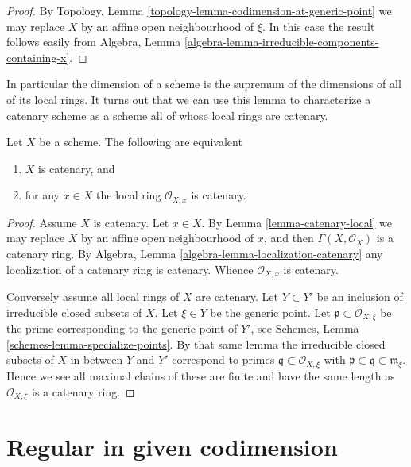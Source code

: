 \begin{proof}
By Topology, Lemma \ref{topology-lemma-codimension-at-generic-point}
we may replace $X$ by an affine open neighbourhood of $\xi$. In this
case the result follows easily from
Algebra, Lemma \ref{algebra-lemma-irreducible-components-containing-x}.
\end{proof}

\noindent
In particular the dimension of a scheme is the supremum of
the dimensions of all of its local rings. It turns out that
we can use this lemma to characterize a catenary scheme as a
scheme all of whose local rings are catenary.

\begin{lemma}
\label{lemma-catenary-local-rings-catenary}
Let $X$ be a scheme. The following are equivalent
\begin{enumerate}
\item $X$ is catenary, and
\item for any $x \in X$ the local ring $\mathcal{O}_{X, x}$ is
catenary.
\end{enumerate}
\end{lemma}

\begin{proof}
Assume $X$ is catenary. Let $x \in X$. By Lemma \ref{lemma-catenary-local}
we may replace $X$ by an affine open neighbourhood of $x$, and
then $\Gamma(X, \mathcal{O}_X)$ is a catenary ring. By
Algebra, Lemma \ref{algebra-lemma-localization-catenary} any
localization of a catenary ring is
catenary. Whence $\mathcal{O}_{X, x}$ is catenary.

\medskip\noindent
Conversely assume all local rings of $X$ are catenary.
Let $Y \subset Y'$ be an inclusion of irreducible closed
subsets of $X$. Let $\xi \in Y$ be the generic point.
Let $\mathfrak p \subset \mathcal{O}_{X, \xi}$ be the prime
corresponding to the generic point of $Y'$, see
Schemes, Lemma \ref{schemes-lemma-specialize-points}. By that same
lemma the irreducible closed subsets of $X$ in between $Y$ and $Y'$
correspond to primes $\mathfrak q \subset \mathcal{O}_{X, \xi}$
with $\mathfrak p \subset \mathfrak q \subset \mathfrak m_{\xi}$.
Hence we see all maximal chains of these are finite and have the
same length as $\mathcal{O}_{X, \xi}$ is a catenary ring.
\end{proof}






\section{Regular in given codimension}
\label{section-Rk}


